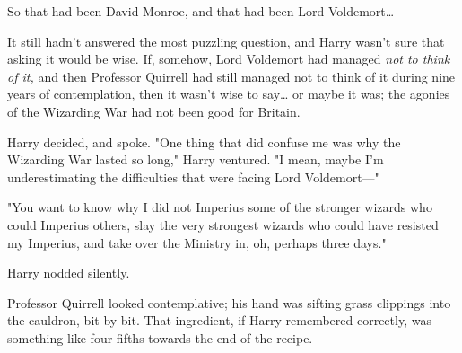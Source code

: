 So that had been David Monroe, and that had been Lord Voldemort{\ldots}

It still hadn't answered the most puzzling question, and Harry wasn't sure that
asking it would be wise. If, somehow, Lord Voldemort had managed \emph{not to
think of it,} and then Professor Quirrell had still managed not to think of it
during nine years of contemplation, then it wasn't wise to say{\ldots} or maybe
it was; the agonies of the Wizarding War had not been good for Britain.

Harry decided, and spoke. "One thing that did confuse me was why the Wizarding
War lasted so long," Harry ventured. "I mean, maybe I'm underestimating the
difficulties that were facing Lord Voldemort---"

"You want to know why I did not Imperius some of the stronger wizards who could
Imperius others, slay the very strongest wizards who could have resisted my
Imperius, and take over the Ministry in, oh, perhaps three days."

Harry nodded silently.

Professor Quirrell looked contemplative; his hand was sifting grass clippings
into the cauldron, bit by bit. That ingredient, if Harry remembered correctly,
was something like four-fifths towards the end of the recipe.

